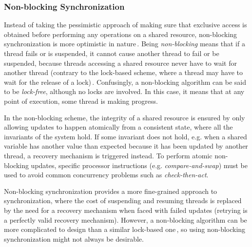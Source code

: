 \subsubsection{Non-blocking Synchronization}
Instead of taking the pessimistic approach of making sure that exclusive access is obtained before performing any operations on a shared resource, non-blocking synchronization is more optimistic in nature\,\citep{Goetz2006}. Being \emph{non-blocking} means that if a thread fails or is suspended, it cannot cause another thread to fail or be suspended, because threads accessing a shared resource never have to wait for another thread (contrary to the lock-based scheme, where a thread may have to wait for the release of a lock)\,\citep{Goetz2006}. Confusingly, a non-blocking algorithm can be said to be \emph{lock-free}, although no locks are involved. In this case, it means that at any point of execution, some thread is making progress.

In the non-blocking scheme, the integrity of a shared resource is ensured by only allowing updates to happen atomically from a consistent state, where all the invariants of the system hold. If some invariant does not hold, e.g. when a shared variable has another value than expected because it has been updated by another thread, a recovery mechanism is triggered instead. To perform atomic non-blocking updates, specific processor instructions (e.g. \emph{compare-and-swap}) must be used to avoid common concurrency problems such as \emph{check-then-act}. 

Non-blocking synchronization provides a more fine-grained approach to synchronization, where the cost of suspending and resuming threads is replaced by the need for a recovery mechanism when faced with failed updates (retrying is a perfectly valid recovery mechanism). However, a non-blocking algorithm can be more complicated to design than a similar lock-based one\,\citep{Goetz2006}, so using non-blocking synchronization might not always be desirable.



